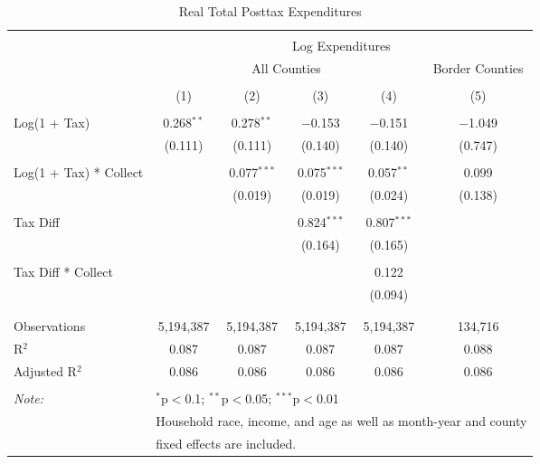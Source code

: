 
\begin{table}[!htbp] \centering 
  \caption{Real Total Posttax Expenditures} 
  \label{} 
\begin{tabular}{@{\extracolsep{5pt}}lccccc} 
\\[-1.8ex]\hline 
\hline \\[-1.8ex] 
 & \multicolumn{5}{c}{Log Expenditures} \\ 
\cline{2-6} 
 & \multicolumn{4}{c}{All Counties} & Border Counties \\ 
\\[-1.8ex] & (1) & (2) & (3) & (4) & (5)\\ 
\hline \\[-1.8ex] 
 Log(1 + Tax) & 0.268$^{**}$ & 0.278$^{**}$ & $-$0.153 & $-$0.151 & $-$1.049 \\ 
  & (0.111) & (0.111) & (0.140) & (0.140) & (0.747) \\ 
  & & & & & \\ 
 Log(1 + Tax) * Collect &  & 0.077$^{***}$ & 0.075$^{***}$ & 0.057$^{**}$ & 0.099 \\ 
  &  & (0.019) & (0.019) & (0.024) & (0.138) \\ 
  & & & & & \\ 
 Tax Diff &  &  & 0.824$^{***}$ & 0.807$^{***}$ &  \\ 
  &  &  & (0.164) & (0.165) &  \\ 
  & & & & & \\ 
 Tax Diff * Collect &  &  &  & 0.122 &  \\ 
  &  &  &  & (0.094) &  \\ 
  & & & & & \\ 
\hline \\[-1.8ex] 
Observations & 5,194,387 & 5,194,387 & 5,194,387 & 5,194,387 & 134,716 \\ 
R$^{2}$ & 0.087 & 0.087 & 0.087 & 0.087 & 0.088 \\ 
Adjusted R$^{2}$ & 0.086 & 0.086 & 0.086 & 0.086 & 0.086 \\ 
\hline 
\hline \\[-1.8ex] 
\textit{Note:}  & \multicolumn{5}{l}{$^{*}$p$<$0.1; $^{**}$p$<$0.05; $^{***}$p$<$0.01} \\ 
 & \multicolumn{5}{l}{Household race, income, and age as well as month-year and county} \\ 
 & \multicolumn{5}{l}{fixed effects are included.} \\ 
\end{tabular} 
\end{table} 
